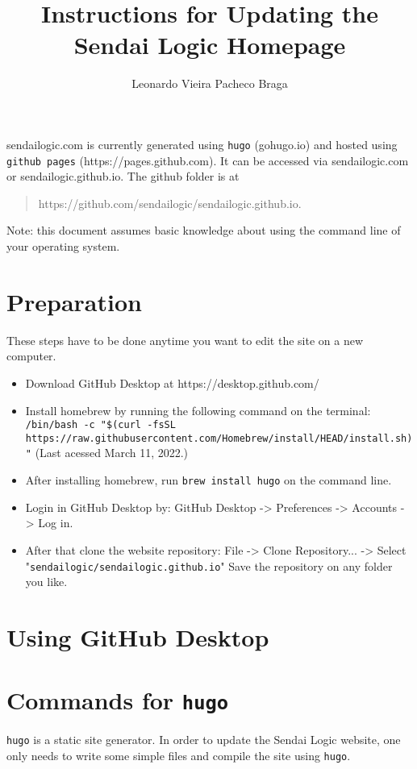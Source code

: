 \documentclass[a4paper]{article}
\title{Instructions for Updating the Sendai Logic Homepage}
\author{Leonardo Vieira Pacheco Braga}
\begin{document}
\maketitle

sendailogic.com is currently generated using \texttt{hugo} (gohugo.io) and hosted using \texttt{github pages} (https://pages.github.com).
It can be accessed via sendailogic.com or sendailogic.github.io.
The github folder is at
\begin{quote}
    https://github.com/sendailogic/sendailogic.github.io.
\end{quote}

Note: this document assumes basic knowledge about using the command line of your operating system.

\section{Preparation}
These steps have to be done anytime you want to edit the site on a new computer.

\begin{itemize}
    \item Download GitHub Desktop at https://desktop.github.com/
    \item Install homebrew by running the following command on the terminal: \texttt{/bin/bash -c "\$(curl -fsSL https://raw.githubusercontent.com/Homebrew/install/HEAD/install.sh)"} (Last acessed March 11, 2022.)
    \item After installing homebrew, run \texttt{brew install hugo} on the command line.
    \item Login in GitHub Desktop by: GitHub Desktop -> Preferences -> Accounts -> Log in.
    \item After that clone the website repository: File -> Clone Repository... -> Select "\texttt{sendailogic/sendailogic.github.io}" Save the repository on any folder you like.
\end{itemize}

\section{Using GitHub Desktop}

\section{Commands for \texttt{hugo}}
\texttt{hugo} is a static site generator.
In order to update the Sendai Logic website, one only needs to write some simple files and compile the site using \texttt{hugo}.
\end{document}
